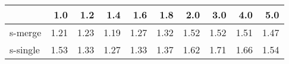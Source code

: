 \begin{tabular}{lrrrrrrrrr}
\toprule
{} &  1.0 &  1.2 &  1.4 &  1.6 &  1.8 &  2.0 &  3.0 &  4.0 &  5.0 \\
\midrule
s-merge  & 1.21 & 1.23 & 1.19 & 1.27 & 1.32 & 1.52 & 1.52 & 1.51 & 1.47 \\
s-single & 1.53 & 1.33 & 1.27 & 1.33 & 1.37 & 1.62 & 1.71 & 1.66 & 1.54 \\
\bottomrule
\end{tabular}
